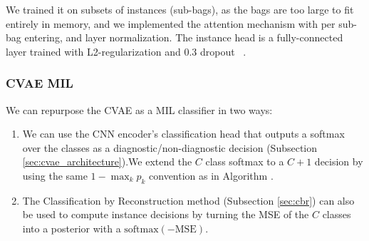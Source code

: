 \documentclass[12pt]{article}
\theoremstyle{paper}
\begin{document}



We trained it on subsets of instances (sub-bags), as the bags are too large to fit entirely in memory, and we implemented the attention mechanism with per sub-bag entering, and  layer normalization. The instance head is a fully-connected layer trained with L2-regularization and 0.3 dropout ~\cite{ilse2018attention}.

\subsubsection{CVAE MIL}
We can repurpose the CVAE as a MIL classifier in two ways:
\begin{enumerate}
    \item We can use the CNN encoder's classification head that outputs a softmax over the classes as a diagnostic/non-diagnostic decision (Subsection \ref{sec:cvae_architecture}).We extend the $C$ class softmax to a $C+1$ decision by using the same $1 - \max_k p_k$ convention as in Algorithm .
    \item The Classification by Reconstruction method (Subsection \ref{sec:cbr}) can also be used to compute instance decisions by turning the MSE of the $C$ classes into a posterior with a $\text{softmax}(-\text{MSE})$. 
\end{enumerate}
\end{document}

